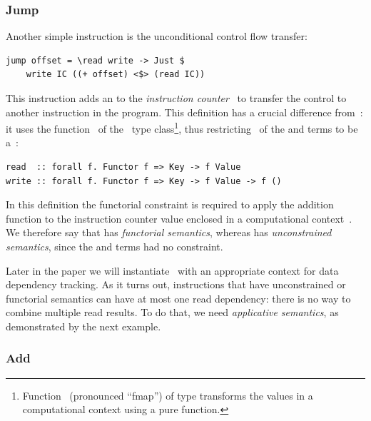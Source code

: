 \subsubsection{Jump}

Another simple instruction is the unconditional control flow transfer:

\begin{verbatim}
jump offset = \read write -> Just $
    write IC ((+ offset) <$> (read IC))
\end{verbatim}

\noindent
This instruction adds an  to the \emph{instruction counter}~
to transfer the control to another instruction in the program. This definition
has a crucial difference from~: it uses the function~\hs{<$>} of
the~ type class\footnote{Function~\hs{<$>} (pronounced ``fmap'') of
type  transforms the values in a
computational context  using a pure function.}, thus restricting~ of
the  and  terms to be a~:

\vspace{-1mm}
\begin{verbatim}
read  :: forall f. Functor f => Key -> f Value
write :: forall f. Functor f => Key -> f Value -> f ()
\end{verbatim}

In this definition the functorial constraint is required to apply the addition
function  to the instruction counter value
enclosed in a computational context~. We therefore say that  has
\emph{functorial semantics}, whereas  has \emph{unconstrained semantics},
since the  and  terms had no constraint.

Later in the paper we will instantiate~ with an appropriate context for
data dependency tracking. As it turns out, instructions that have unconstrained
or functorial semantics can have at most one read dependency: there is no way
to combine multiple read results. To do that, we need \emph{applicative
semantics}, as demonstrated by the next example.

\vspace{-3mm}
\subsubsection{Add}

